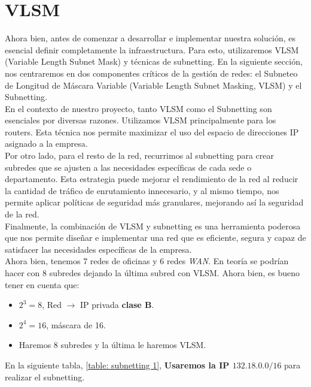 \section{VLSM}


Ahora bien, antes de comenzar a desarrollar e implementar nuestra solución, es
esencial definir completamente la infraestructura. Para esto, utilizaremos
VLSM (Variable Length Subnet Mask) y técnicas de subnetting. En la siguiente
sección, nos centraremos en dos componentes críticos de la gestión de redes:
el Subneteo de Longitud de Máscara Variable
(Variable Length Subnet Masking, VLSM) y el Subnetting.
\\


En el contexto de nuestro proyecto, tanto VLSM como el Subnetting son esenciales
por diversas razones. Utilizamos VLSM principalmente para los routers. Esta
técnica nos permite maximizar el uso del espacio de direcciones IP asignado a
la empresa.
\\


Por otro lado, para el resto de la red, recurrimos al subnetting para crear
subredes que se ajusten a las necesidades específicas de cada sede o
departamento. Esta estrategia puede mejorar el rendimiento de la red al reducir
la cantidad de tráfico de enrutamiento innecesario, y al mismo tiempo, nos
permite aplicar políticas de seguridad más granulares, mejorando así la
seguridad de la red.
\\

Finalmente, la combinación de VLSM y subnetting es una herramienta poderosa que
nos permite diseñar e implementar una red que es eficiente, segura y capaz de
satisfacer las necesidades específicas de la empresa.
\\

Ahora bien, tenemos 7 redes de oficinas y 6 redes \textit{WAN}. En teoría se
podrían hacer con 8 subredes dejando la última subred con VLSM. Ahora bien, es
bueno tener en cuenta que:

\begin{itemize}
    \item \(2^3 = 8\), Red \(\rightarrow\) IP privada \textbf{clase B}.
    \item \(2^4 = 16\), máscara de 16.
    \item Haremos 8 subredes y la última le haremos VLSM.
\end{itemize}

En la siguiente tabla, \cref{table: subnetting 1}, \textbf{Usaremos la IP \(132.18.0.0/16\)}
para realizar el subnetting.


